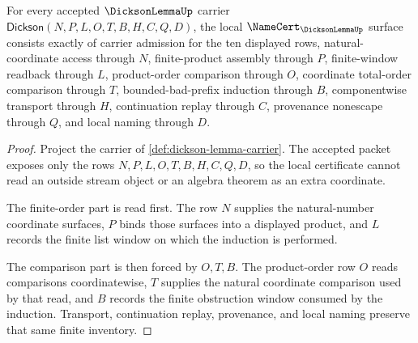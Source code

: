\begin{theorem}\label{thm:dickson-lemma-namecert-obligations}
For every accepted $\DicksonLemmaUp$ carrier $\mathsf{Dickson}(N,P,L,O,T,B,H,C,Q,D)$, the local $\NameCert_{\DicksonLemmaUp}$ surface consists exactly of carrier admission for the ten displayed rows, natural-coordinate access through $N$, finite-product assembly through $P$, finite-window readback through $L$, product-order comparison through $O$, coordinate total-order comparison through $T$, bounded-bad-prefix induction through $B$, componentwise transport through $H$, continuation replay through $C$, provenance nonescape through $Q$, and local naming through $D$.
\end{theorem}
\begin{proof}
Project the carrier of \autoref{def:dickson-lemma-carrier}. The accepted packet exposes only the rows $N,P,L,O,T,B,H,C,Q,D$, so the local certificate cannot read an outside stream object or an algebra theorem as an extra coordinate.

The finite-order part is read first. The row $N$ supplies the natural-number coordinate surfaces, $P$ binds those surfaces into a displayed product, and $L$ records the finite list window on which the induction is performed.

The comparison part is then forced by $O,T,B$. The product-order row $O$ reads comparisons coordinatewise, $T$ supplies the natural coordinate comparison used by that read, and $B$ records the finite obstruction window consumed by the induction. Transport, continuation replay, provenance, and local naming preserve that same finite inventory.
\end{proof}

